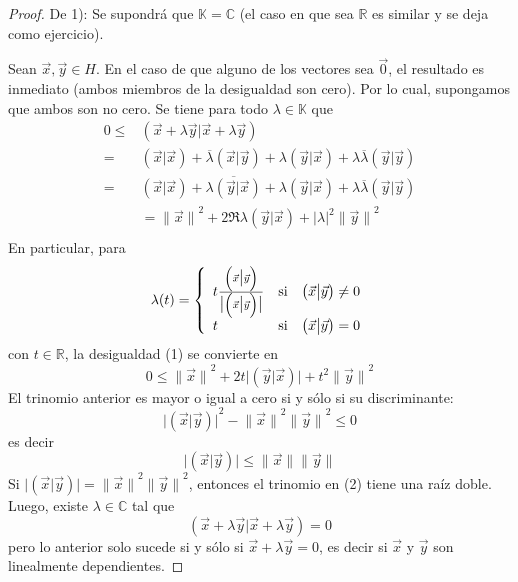 \documentclass[12pt]{report}
\newcounter{it}
\theoremstyle{largebreak}
\newcommand\abs[1]{\ensuremath{\big|#1\big|}}
\newcommand\norm[1]{\ensuremath{\|#1\|}}
\newcommand\pint[2]{\ensuremath{\left(#1\big| #2\right)}}
\newcommand\conj[1]{\ensuremath{\overline{#1}}}
\begin{document}
    \begin{proof}
        De 1): Se supondrá que $\mathbb{K}=\mathbb{C}$ (el caso en que sea $\mathbb{R}$ es similar y se deja como ejercicio).

        Sean $\vec{x},\vec{y}\in H$. En el caso de que alguno de los vectores sea $\vec{0}$, el resultado es inmediato (ambos miembros de la desigualdad son cero). Por lo cual, supongamos que ambos son no cero. Se tiene para todo $\lambda\in\mathbb{K}$ que
        \begin{equation}
            \begin{split}
                0\leq& \pint{\vec{x}+\lambda\vec{y}}{\vec{x}+\lambda\vec{y}}\\
                =& \pint{\vec{x}}{\vec{x}}+\conj{\lambda}\pint{\vec{x}}{\vec{y}}+\lambda\pint{\vec{y}}{\vec{x}}+\lambda\conj{\lambda}\pint{\vec{y}}{\vec{y}}\\
                =& \pint{\vec{x}}{\vec{x}}+\conj{\lambda\pint{\vec{y}}{\vec{x}}}+\lambda\pint{\vec{y}}{\vec{x}}+\lambda\conj{\lambda}\pint{\vec{y}}{\vec{y}}\\
                &= \norm{\vec{x}}^2+2\Re{\lambda\pint{\vec{y}}{\vec{x}}}+\abs{\lambda}^2\norm{\vec{y}}^2\\
            \end{split}
        \end{equation}
        En particular, para
        \begin{equation*}
            \lambda(t)=\left\{\begin{array}{lcr}
                    t\frac{\pint{\vec{x}}{\vec{y}}}{\abs{\pint{\vec{x}}{\vec{y}}}} & \textup{si} & \pint{\vec{x}}{\vec{y}}\neq0\\
                    t & \textup{si} & \pint{\vec{x}}{\vec{y}}=0
                \end{array}
            \right.
        \end{equation*}
        con $t\in\mathbb{R}$, la desigualdad (1) se convierte en
        \begin{equation}
            0\leq\norm{\vec{x}}^2+2t\abs{\pint{\vec{y}}{\vec{x}}}+t^2\norm{\vec{y}}^2
        \end{equation}
        El trinomio anterior es mayor o igual a cero si y sólo si su discriminante:
        \begin{equation*}
            \abs{\pint{\vec{x}}{\vec{y}}}^2-\norm{\vec{x}}^2\norm{\vec{y}}^2\leq0
        \end{equation*}
        es decir
        \begin{equation*}
            \abs{\pint{\vec{x}}{\vec{y}}}\leq\norm{\vec{x}}\norm{\vec{y}}
        \end{equation*}
        Si $\abs{\pint{\vec{x}}{\vec{y}}}=\norm{\vec{x}}^2\norm{\vec{y}}^2$, entonces el trinomio en (2) tiene una raíz doble. Luego, existe $\lambda\in\mathbb{C}$ tal que
        \begin{equation*}
            \pint{\vec{x}+\lambda\vec{y}}{\vec{x}+\lambda\vec{y}}=0
        \end{equation*}
        pero lo anterior solo sucede si y sólo si $\vec{x}+\lambda\vec{y}=0$, es decir si $\vec{x}$ y $\vec{y}$ son linealmente dependientes.


\end{proof}
\end{document}
